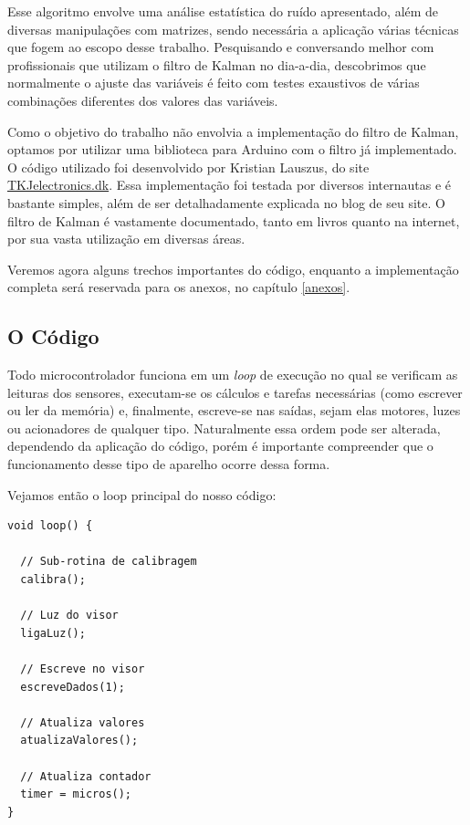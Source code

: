 \documentclass[a4paper,12pt]{article}
\begin{document}
Esse algoritmo envolve uma análise estatística do ruído apresentado, além de diversas manipulações com matrizes, sendo necessária a aplicação várias técnicas que fogem ao escopo desse trabalho. Pesquisando e conversando melhor com profissionais que utilizam o filtro de Kalman no dia-a-dia, descobrimos que normalmente o ajuste das variáveis é feito com testes exaustivos de várias combinações diferentes dos valores das variáveis.

Como o objetivo do trabalho não envolvia a implementação do filtro de Kalman, optamos por utilizar uma biblioteca para Arduino com o filtro já implementado. O código utilizado foi desenvolvido por Kristian Lauszus, do site \href{http://www.tkjelectronics.dk/}{TKJelectronics.dk}. Essa implementação foi testada por diversos internautas e é bastante simples, além de ser detalhadamente explicada no blog de seu site. O filtro de Kalman é vastamente documentado, tanto em livros quanto na internet, por sua vasta utilização em diversas áreas.

Veremos agora alguns trechos importantes do código, enquanto a implementação completa será reservada para os anexos, no capítulo \ref{anexos}.

\subsection{O Código}

Todo microcontrolador funciona em um \textit{loop} de execução no qual se verificam as leituras dos sensores, executam-se os cálculos e tarefas necessárias (como escrever ou ler da memória) e, finalmente, escreve-se nas saídas, sejam elas motores, luzes ou acionadores de qualquer tipo. Naturalmente essa ordem pode ser alterada, dependendo da aplicação do código, porém é importante compreender que o funcionamento desse tipo de aparelho ocorre dessa forma.

Vejamos então o loop principal do nosso código:

\newpage
{\singlespace\begin{lstlisting}
void loop() {
  
  // Sub-rotina de calibragem
  calibra();
  
  // Luz do visor
  ligaLuz();

  // Escreve no visor
  escreveDados(1);
  
  // Atualiza valores  
  atualizaValores();
  
  // Atualiza contador
  timer = micros();  
}
\end{lstlisting}
}
\end{document}
